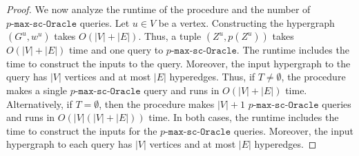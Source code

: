 \documentclass{article}
\newcommand{\functionMaximizationOracleStrongCover}[1]{\ensuremath{{#1}\text{-}\mathtt{max}\text{-}\mathtt{sc}\text{-}\mathtt{Oracle}}\xspace}
\begin{document}
\begin{proof}
We now analyze the runtime of the procedure and the number of \functionMaximizationOracleStrongCover{p} queries. Let $u \in V$ be a vertex. Constructing the hypergraph $(G^{u}, w^{u})$ takes $O(|V| + |E|)$. Thus, a tuple $(Z^{u}, p(Z^u))$ takes $O(|V|+|E|)$ time and one query to \functionMaximizationOracleStrongCover{p}. The runtime includes the time to construct the inputs to the query. Moreover, the input hypergraph to the query has $|V|$ vertices and at most $|E|$ hyperedges. Thus, if $T \not = \emptyset$, the procedure makes a single \functionMaximizationOracleStrongCover{p} query and runs in $O(|V| + |E|)$ time. Alternatively, if  $T  = \emptyset$, then the procedure makes $|V| + 1$ \functionMaximizationOracleStrongCover{p} queries and runs in $O(|V|(|V| + |E|))$ time. In both cases, the runtime includes the time to construct the inputs for the \functionMaximizationOracleStrongCover{p} queries. Moreover, the input hypergraph to each query has $|V|$ vertices and at most $|E|$ hyperedges.
\end{proof}
\end{document}
